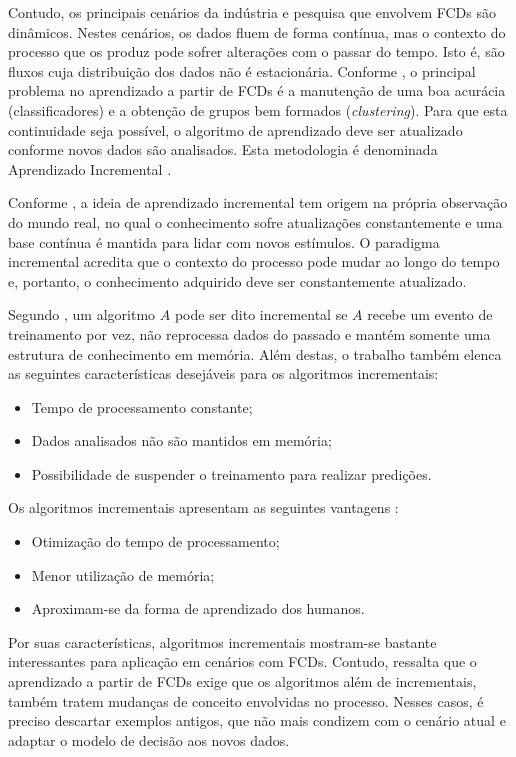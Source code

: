 \documentclass[qual, classic, a4paper]{ufbathesis}
\begin{document}
Contudo, os principais cenários da indústria e pesquisa que envolvem FCDs são dinâmicos.
Nestes cenários, os dados fluem de forma contínua, 
mas o contexto do processo que os produz pode sofrer alterações com o passar do tempo.
Isto é, são fluxos cuja distribuição dos dados não é estacionária.
Conforme \cite{Gama:Rodrigues:2009}, o principal problema no aprendizado a partir de FCDs é a manutenção de uma boa acurácia (classificadores) e a obtenção de grupos bem formados (\textit{clustering}).
Para que esta continuidade seja possível, o algoritmo de aprendizado deve ser atualizado conforme novos dados são analisados.
Esta metodologia é denominada Aprendizado Incremental \cite{Gama:2014:SCD:2597757.2523813}.

Conforme \cite{Fisher:1987:KAV:639960.639990}, a ideia de aprendizado incremental tem origem na própria observação do mundo real, 
no qual o conhecimento sofre atualizações constantemente e uma base contínua é mantida para lidar com novos estímulos.
O paradigma incremental acredita que o contexto do processo pode mudar ao longo do tempo e, portanto, 
o conhecimento adquirido deve ser constantemente atualizado. 

Segundo \cite{Langley:reimann1995learning}, um algoritmo $A$ pode ser dito incremental se $A$ recebe um evento de treinamento por vez,
não reprocessa dados do passado e mantém somente uma estrutura de conhecimento em memória. 
Além destas, o trabalho também elenca as seguintes características desejáveis para os algoritmos incrementais:

\begin{itemize}
    \item Tempo de processamento constante;
    \item Dados analisados não são mantidos em memória;
    \item Possibilidade de suspender o treinamento para realizar predições.
\end{itemize}

Os algoritmos incrementais apresentam as seguintes vantagens \cite{pinto2005algoritmos}:

\begin{itemize}
    \item Otimização do tempo de processamento;
    \item Menor utilização de memória;
    \item Aproximam-se da forma de aprendizado dos humanos.
\end{itemize}

Por suas características, algoritmos incrementais mostram-se bastante interessantes para aplicação em cenários com FCDs.
Contudo, \cite{GamaMCR04} ressalta que o aprendizado a partir de FCDs exige que os algoritmos além de incrementais, 
também tratem mudanças de conceito envolvidas no processo.
Nesses casos, é preciso descartar exemplos antigos, que não mais condizem com o cenário atual e adaptar o modelo de decisão aos novos dados.
\end{document}
